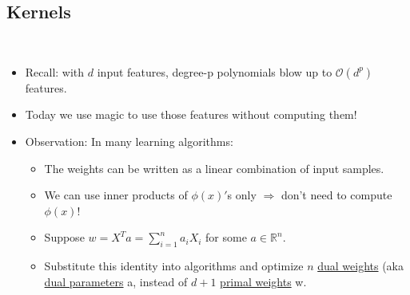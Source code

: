 \documentclass[10pt]{article}
\begin{document}
	\subsection*{Kernels}
	\
	\begin{itemize}
		\item Recall: with $d$ input features, degree-p polynomials blow up to $\mathcal{O}(d^{p})$ features.
		\item Today we use magic to use those features without computing them!
		\item Observation: In many learning algorithms:
			\begin{itemize}
				\item The weights can be written as a linear combination of input samples.
				\item We can use inner products of $\phi(x)'$s only $\Rightarrow$ don't need to compute $\phi(x)$!
				\item Suppose $w = X^{T}a = \sum_{i=1}^{n} a_{i}X_{i}$ for some $a \in \mathbb{R}^{n}$.
				\item Substitute this identity into algorithms and optimize $n$ \underline{dual weights} (aka \underline{dual parameters} a, instead of $d+1$ \underline{primal weights} w.
			\end{itemize}
	\end{itemize}
	
\end{document}
